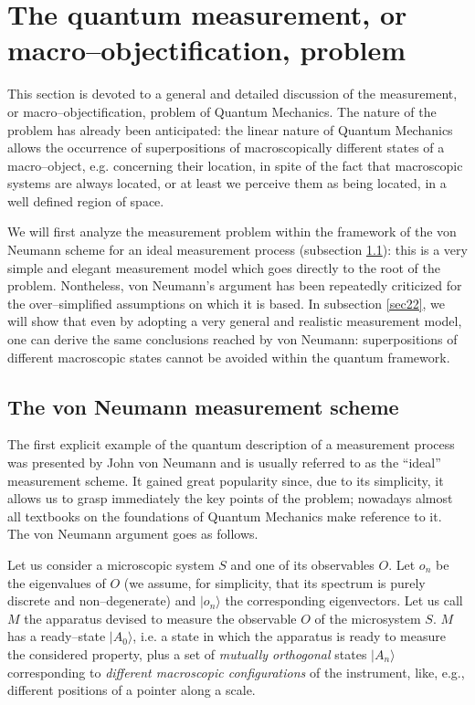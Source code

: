 \documentclass[12pt]{article}
\begin{document}
\section{The quantum measurement, or
macro--objecti\-fi\-ca\-ti\-on, problem} \label{sec2}

This section is devoted to a general and detailed discussion of
the measurement, or macro--objectification, problem of Quantum
Mechanics. The nature of the problem has already been anticipated:
the linear nature of Quantum Mechanics allows the occurrence of
superpositions of macroscopically different states of a
macro--object, e.g. concerning their location, in spite of the
fact that macroscopic systems are always located, or at least we
perceive them as being located, in a well defined region of space.

We will first analyze the measurement problem within the framework
of the von Neumann scheme for an ideal measurement process
(subsection \ref{sec21}): this is a very simple and elegant
measurement model which goes directly to the root of the problem.
Nontheless, von Neumann's argument has been repeatedly criticized
for the over--simplified assumptions on which it is based. In
subsection \ref{sec22}, we will show that even by adopting a very
general and realistic measurement model, one can derive the same
conclusions reached by von Neumann: superpositions of different
macroscopic states cannot be avoided within the quantum framework.




\subsection{The von Neumann measurement scheme} \label{sec21}

The first explicit example of the quantum description of a
measurement process was presented by John von Neumann  \cite{vn}
and is usually referred to as the ``ideal'' measurement scheme. It
gained great popularity since, due to its simplicity, it allows us
to grasp immediately the key points of the problem; nowadays
almost all textbooks on the foundations of Quantum Mechanics make
reference to it. The von Neumann argument goes as follows.

Let us consider a microscopic system $S$ and one of its
observables $O$. Let $o_{n}$ be the eigenvalues of $O$ (we assume,
for simplicity, that its spectrum is purely discrete and
non--degenerate) and $|o_{n}\rangle$ the corresponding
eigenvectors. Let us call $M$ the apparatus devised to measure the
observable $O$ of the microsystem $S$.  $M$ has a ready--state
$|A_{0}\rangle$, i.e. a state in which the apparatus is ready to
measure the considered property, plus a set of {\it mutually
orthogonal} states  $|A_{n}\rangle$ corresponding to {\it
different macroscopic configurations} of the instrument, like,
e.g., different positions of a pointer along a scale.
\end{document}

